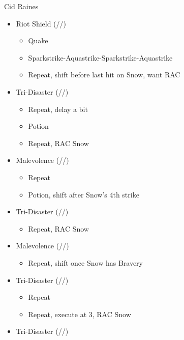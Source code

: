 	\vfill
	\renewcommand{\first}{[1] Riot Shield (\rav/\sen/\syn)}
	\renewcommand{\second}{[2] Tri-Disaster (\rav/\rav/\rav)}
	\renewcommand{\third}{[3] Malevolence (\rav/\rav/\syn)}
	\renewcommand{\fourth}{[4] Tri-Disaster (\rav/\rav/\rav)}
	\renewcommand{\fifth}{[5] Aggression (\com/\com/\rav)}
	\begin{battle}[1:35]{Cid Raines}
		\begin{itemize}
			\item \first
			      \begin{itemize}
				      \item Quake
				      \item Sparkstrike-Aquastrike-Sparkstrike-Aquastrike
				      \item Repeat, shift before last hit on Snow, want RAC
			      \end{itemize}
			\item \second
			      \begin{itemize}
				      \item Repeat, delay a bit
				      \item Potion
				      \item Repeat, RAC Snow
			      \end{itemize}
			\item \third
			      \begin{itemize}
				      \item Repeat
				      \item Potion, shift after Snow's 4th strike
			      \end{itemize}
			\item \second
			      \begin{itemize}
				      \item Repeat, RAC Snow
			      \end{itemize}
			\item \third
			      \begin{itemize}
				      \item Repeat, shift once Snow has Bravery
			      \end{itemize}
			\item \second
			      \begin{itemize}
				      \item Repeat
				      \item Repeat, execute at 3, RAC Snow
			      \end{itemize}
			\item \fourth
			      \begin{itemize}

\end{itemize}
\end{itemize}
\end{battle}
